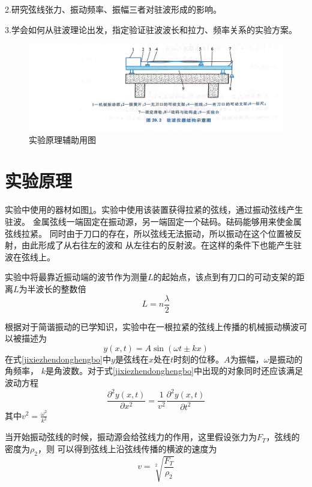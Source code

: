 \documentclass{ctexart}
\begin{document}
  2.\quad 研究弦线张力、振动频率、振幅三者对驻波形成的影响。
  
  3.\quad 学会如何从驻波理论出发，指定验证驻波波长和拉力、频率关系的实验方案。
  \begin{figure}[h]
    \centering
    \includegraphics[height=0.4\textwidth,width=1\textwidth]{yuanli1.jpg}
    \caption{实验原理辅助用图}\label{figureyuanli1}
  \end{figure}

\section{实验原理}
实验中使用的器材如图\ref{figureyuanli1}。实验中使用该装置获得拉紧的弦线，通过振动弦线产生驻波。
金属弦线一端固定在振动源，另一端固定一个砝码。砝码能够用来使金属弦线拉紧。
同时由于刀口的存在，所以弦线无法振动，所以振动在这个位置被反射，由此形成了从右往左的波和
从左往右的反射波。在这样的条件下也能产生驻波在弦线上。

实验中将最靠近振动端的波节作为测量$L$的起始点，该点到有刀口的可动支架的距离$L$为半波长的整数倍
\begin{equation}
  L=n \frac{\lambda}{2}
\end{equation}

根据对于简谐振动的已学知识，实验中在一根拉紧的弦线上传播的机械振动横波可以被描述为
\begin{equation}\label{jixiezhendonghengbo}
  y(x,t)=A\sin ( \omega t \pm kx)
\end{equation}
在式\ref{jixiezhendonghengbo}中$y$是弦线在$x$处在$t$时刻的位移。$A$为振幅，$\omega$是振动的角频率，
$k$是角波数。对于式\ref{jixiezhendonghengbo}中出现的对象同时还应该满足波动方程
\begin{equation}\label{bodongfangcheng}
  \frac{\partial ^{2} y(x,t)}{\partial x^{2}} = \frac{1}{v^{2}} \frac{\partial ^{2} y(x,t)}{\partial t^{2}}
\end{equation}
其中$v^{2} = \frac{\omega ^{2}}{k^{2}}$

当开始振动弦线的时候，振动源会给弦线力的作用，这里假设张力为$F_{T}$，弦线的密度为$\rho _{2}$，则
可以得到弦线上沿弦线传播的横波的速度为
\begin{equation}\label{bosufangcheng}
  v=\sqrt[2]{\frac{F_{T}}{\rho _{2}}}
\end{equation}
\end{document}
